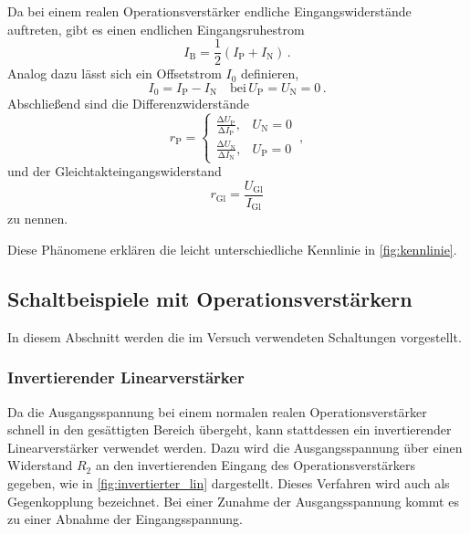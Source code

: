 Da bei einem realen Operationsverstärker endliche Eingangswiderstände auftreten, gibt es einen endlichen Eingangsruhestrom 
\begin{equation*}
    I_\text{B} = \frac{1}{2}\left( I_\text{P} + I_\text{N}\right)\, .
\end{equation*}
Analog dazu lässt sich ein Offsetstrom $I_0$ definieren, 
\begin{equation*}
    I_0 = I_\text{P} - I_\text{N}\quad \text{bei}\, U_\text{P} = U_\text{N}=0\, .
\end{equation*}
Abschließend sind die Differenzwiderstände
\begin{equation*}
    r_\text{P} = \begin{cases}
        \frac{\increment U_\text{P}}{\increment I_\text{P}} , & U_\text{N}=0\\
        \frac{\increment U_\text{N}}{\increment I_\text{N}} , & U_\text{P}=0
    \end{cases}\, ,
\end{equation*}
und der Gleichtakteingangswiderstand 
\begin{equation*}
    r_\text{Gl} = \frac{U_\text{Gl}}{I_\text{Gl}}
\end{equation*}
zu nennen.

Diese Phänomene erklären die leicht unterschiedliche Kennlinie in \autoref{fig:kennlinie}.

\subsection{Schaltbeispiele mit Operationsverstärkern}

\noindent 
In diesem Abschnitt werden die im Versuch verwendeten Schaltungen vorgestellt. 

\subsubsection{Invertierender Linearverstärker}

\noindent 
Da die Ausgangsspannung bei einem normalen realen Operationsverstärker schnell in den gesättigten Bereich übergeht, kann stattdessen ein invertierender Linearverstärker verwendet werden. Dazu wird die Ausgangsspannung über einen Widerstand $R_2$ an den invertierenden Eingang des Operationsverstärkers gegeben, wie in \autoref{fig:invertierter_lin} dargestellt. Dieses Verfahren wird auch als Gegenkopplung bezeichnet. Bei einer Zunahme der Ausgangsspannung kommt es zu einer Abnahme der Eingangsspannung. 

